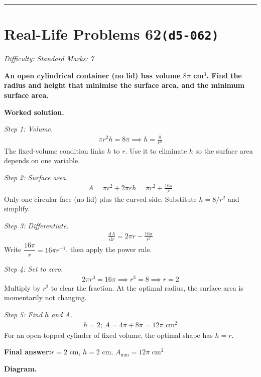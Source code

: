 \documentclass[11pt]{article}
\newcommand{\question}[1]{\par\medskip\noindent\textbf{#1}\par}
\begin{document}
\medskip\hrule

\section*{Real-Life Problems 62\quad\small\texttt{(d5-062)}}
\textit{Difficulty: Standard \quad\textbar\quad Marks: 7}

\question{An open cylindrical container (no lid) has volume \( 8\pi \) cm\(^3\). Find the radius and height that minimise the surface area, and the minimum surface area.}

\textbf{Worked solution.}

\textit{Step 1: Volume.}
\[\begin{gathered}
\pi r^2 h = 8\pi \implies h = \frac{8}{r^2}
\end{gathered}\]
The fixed-volume condition links \( h \) to \( r \). Use it to eliminate \( h \) so the surface area depends on one variable.

\textit{Step 2: Surface area.}
\[\begin{gathered}
A = \pi r^2 + 2\pi r h = \pi r^2 + \frac{16\pi}{r}
\end{gathered}\]
Only one circular face (no lid) plus the curved side. Substitute \( h = 8/r^2 \) and simplify.

\textit{Step 3: Differentiate.}
\[\begin{gathered}
\frac{\mathrm{d}A}{\mathrm{d}r} = 2\pi r - \frac{16\pi}{r^2}
\end{gathered}\]
Write \( \dfrac{16\pi}{r} = 16\pi r^{-1} \), then apply the power rule.

\textit{Step 4: Set to zero.}
\[\begin{gathered}
2\pi r^3 = 16\pi \implies r^3 = 8 \implies r = 2
\end{gathered}\]
Multiply by \( r^2 \) to clear the fraction. At the optimal radius, the surface area is momentarily not changing.

\textit{Step 5: Find \( h \) and \( A \).}
\[\begin{gathered}
h = 2; \, A = 4\pi + 8\pi = 12\pi \text{ cm}^2
\end{gathered}\]
For an open-topped cylinder of fixed volume, the optimal shape has \( h = r \).

\begin{answerbox}
\textbf{Final answer:}\quad \(\displaystyle  r = 2 \) cm, \(\displaystyle  h = 2 \) cm, \(\displaystyle  A_{\min} = 12\pi \text{ cm}^2 \)
\end{answerbox}
\textbf{Diagram.}
\end{document}
